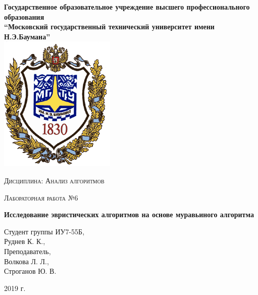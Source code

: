 \documentclass[a4paper,12pt]{report}
\begin{document}
    \begin{titlepage}

        \begin{center}
            \large
            \textbf{Государственное образовательное учреждение высшего профессионального образования\\
            “Московский государственный технический университет имени Н.Э.Баумана”\\}
            \includegraphics{bmstu-logo.png}
			\vspace{1cm}
            
            \textsc{Дисциплина: Анализ алгоритмов}
            \vspace{0.5cm}
                
            \textsc{Лабораторная работа №6}
            \vspace{1cm}
            
            {\LARGE \textbf{Исследование эвристических алгоритмов на основе муравьиного алгоритма}}
            \vspace{3cm}
                    
            \begin{flushright}
            	Студент группы ИУ7-55Б,\\   
            	Руднев К. К.,\\
            	\vspace{0.5cm}
            	Преподаватель,\\
            	Волкова Л. Л.,\\
            	Строганов Ю. В.
            	
            \end{flushright}
            \vfill
            
            2019 г.
            
            \end{center}

    \end{titlepage}
\end{document}
